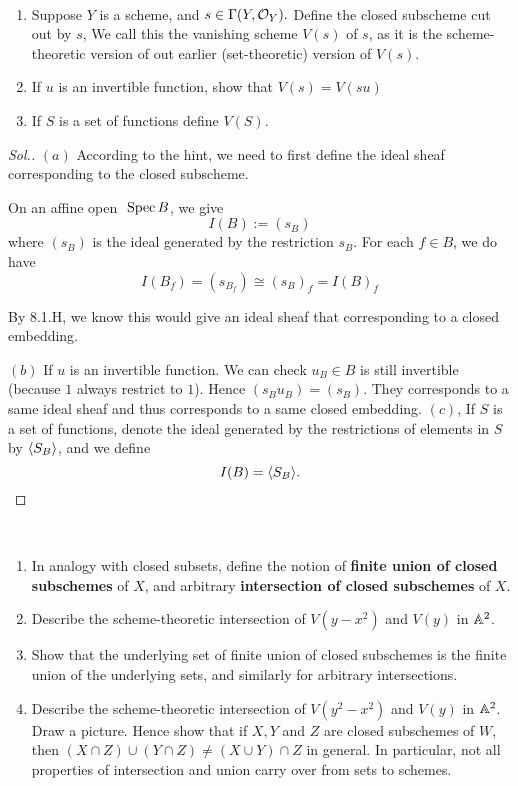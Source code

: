 \documentclass[11pt]{book} %
\begin{document}
\begin{exr}
\ \begin{enumerate}[label=(\alph*)]
\item Suppose $Y$  is a scheme, and $s\in \Gamma(Y,{\cal O}_Y).$ Define the closed subscheme cut out by $s$, We call this the vanishing scheme $V(s)$ of $s$, as it is the scheme-theoretic version of out earlier (set-theoretic) version of $V(s)$. 
\item If $u$ is an invertible function, show that $V(s)=V(su)$
\item If $S$ is a set of functions define $V(S)$.
\end{enumerate}
\end{exr}
\begin{proof}[Sol.]
$(a)$ According to the hint, we need to first define the ideal sheaf corresponding to the closed subscheme. 

On an affine open $\text{ Spec\,} B$, we give
$$
I(B):= (s_B)
$$
where $(s_B)$ is the ideal generated by the restriction  $s_B$. For each $f\in B$, we do have
$$
I(B_f)=(s_{B_f})\cong(s_B)_f=I(B)_f
$$

By 8.1.H, we know this would give an ideal sheaf that corresponding to a closed embedding.

$(b)$ If $u$ is an invertible function. We can check $u_B\in B$ is still invertible (because $1$ always restrict to $1$). Hence $(s_B u_B)=(s_B)$. They corresponds to a same ideal sheaf and thus corresponds to a same closed embedding.
$(c)$, If $S$ is a set of functions, denote the ideal generated by the restrictions of elements in $S$ by $\langle S_B\rangle$, and we define 
$$
I(B)=\langle S_B\rangle.
$$
\end{proof}
\begin{exr}
\ 
\begin{enumerate}[label=(\alph*)]
\item In analogy with closed subsets, define the notion of \textbf{finite union of closed subschemes } of $X$, and arbitrary \textbf{intersection of closed subschemes} of $X$.
\item Describe the scheme-theoretic intersection of $V(y-x^2)$ and $V(y)$ in $\mathbb A^2$.
\item Show that the underlying set of finite union of closed subschemes is the finite union of the underlying sets, and similarly for arbitrary intersections.
\item Describe the scheme-theoretic intersection of $V(y^2-x^2)$ and $V(y)$ in $\mathbb A^2$. Draw a picture. Hence show that if $X,Y$ and $Z$ are closed subschemes of $W$, then $(X\cap Z)\cup (Y\cap Z)\neq (X\cup Y)\cap Z$ in general. In particular, not all properties of intersection and union carry over from  sets to schemes.
\end{enumerate}
\end{exr}
\end{document}
